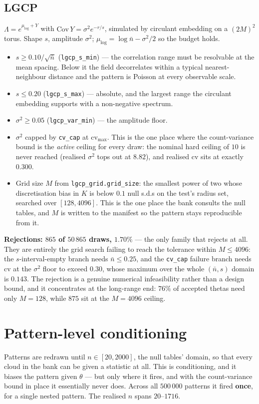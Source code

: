 \documentclass[11pt]{article}
\newcommand{\nb}{\bar n}
\newcommand{\cvmax}{\mathrm{cv}_{\max}}
\newcommand{\code}[1]{\texttt{#1}}
\begin{document}
\subsection*{LGCP}
$\Lambda=e^{\mu_{\log}+Y}$ with $\mathrm{Cov}\,Y=\sigma^2e^{-r/s}$, simulated by circulant embedding on a $(2M)^2$ torus. Shape $s$, amplitude $\sigma^2$; $\mu_{\log}=\log\nb-\sigma^2/2$ so the budget holds.
\begin{itemize}
  \item $s\ge0.10/\sqrt{\nb}$ (\code{lgcp\_s\_min}) --- the correlation range must be resolvable at the mean spacing. Below it the field decorrelates within a typical nearest-neighbour distance and the pattern is Poisson at every observable scale.
  \item $s\le0.20$ (\code{lgcp\_s\_max}) --- absolute, and the largest range the circulant embedding supports with a non-negative spectrum.
  \item $\sigma^2\ge0.05$ (\code{lgcp\_var\_min}) --- the amplitude floor.
  \item $\sigma^2$ capped by \code{cv\_cap} at $\cvmax$. This is the one place where the count-variance bound is the \emph{active} ceiling for every draw: the nominal hard ceiling of $10$ is never reached (realised $\sigma^2$ tops out at $8.82$), and realised cv sits at exactly $0.300$.
  \item Grid size $M$ from \code{lgcp\_grid.grid\_size}: the smallest power of two whose discretisation bias in $K$ is below $0.1$ null s.d.s on the test's radius set, searched over $[128,4096]$. This is the one place the bank consults the null tables, and $M$ is written to the manifest so the pattern stays reproducible from it.
\end{itemize}
\textbf{Rejections: $865$ of $50\,865$ draws, $1.70\%$} --- the only family that rejects at all. They are entirely the grid search failing to reach the tolerance within $M\le4096$: the $s$-interval-empty branch needs $\nb\le0.25$, and the \code{cv\_cap} failure branch needs cv at the $\sigma^2$ floor to exceed $0.30$, whose maximum over the whole $(\nb,s)$ domain is $0.143$. The rejection is a genuine numerical infeasibility rather than a design bound, and it concentrates at the long-range end: $76\%$ of accepted thetas need only $M=128$, while $875$ sit at the $M=4096$ ceiling.

\section{Pattern-level conditioning}
Patterns are redrawn until $n\in[20,2000]$, the null tables' domain, so that every cloud in the bank can be given a statistic at all. This is conditioning, and it biases the pattern given $\theta$ --- but only where it fires, and with the count-variance bound in place it essentially never does. Across all $500\,000$ patterns it fired \textbf{once}, for a single nested pattern. The realised $n$ spans $20$--$1716$.
\end{document}
